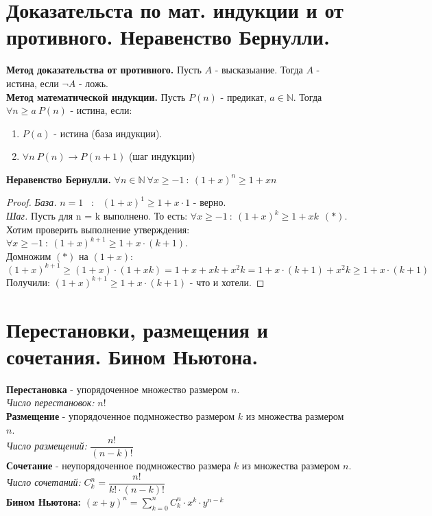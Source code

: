 \documentclass[12pt]{article}
\begin{document}
\section{Доказательста по мат. индукции и от противного. Неравенство Бернулли. }
    \textbf{Метод доказательства от противного.} Пусть $A$ - высказыание. Тогда $A$ - истина, если $\neg A$ - ложь. \\
    \textbf{Метод математической индукции.} Пусть $P(n)$ - предикат, $a \in \mathbb{N}$. Тогда $\forall n \geq a\ P(n)$ - истина, если: 
    \begin{enumerate}[itemsep=0mm, topsep=0mm, partopsep=0mm]
        \item $P(a)$ - истина (база индукции).
        \item $\forall n \ P(n) \to P(n+1)$ (шаг индукции)
    \end{enumerate}
    \textbf{Неравенство Бернулли.} $\forall n \in \mathbb{N} \ \forall x \geq -1 \ : \  (1 + x)^n \geq 1 + xn$ 
    \begin{proof}
        \textit{База.} $n = 1$ \ : \ $(1 + x)^1 \geq 1 + x \cdot 1$ - верно. \\
        \textit{Шаг.} Пусть для n = k выполнено. То есть:  $\forall x \geq -1 \ : \  (1+x)^k \geq 1 + xk \ \ (*)$.\\
        Хотим проверить выполнение утверждения:  $\forall x \geq -1 \ : \  (1+x)^{k+1} \geq 1 + x \cdot (k + 1)$. \\
        Домножим $(*)$ на $(1+x)$: \\
        $(1+x)^{k+1} \geq (1+x) \cdot (1+xk) = 1 + x + xk + x^2k = 1 + x \cdot (k + 1) + x^2k \geq 1 + x \cdot (k + 1) $ \\
        Получили: $(1+x)^{k+1} \geq 1 + x \cdot (k + 1)$ - что и хотели.
        
    \end{proof}

\section{Перестановки, размещения и сочетания. Бином Ньютона.}
    \textbf{Перестановка} - упорядоченное множество размером $n$. \\ \textit{Число перестановок:} $n!$ \\
    \textbf{Размещение} - упорядоченное подмножество размером $k$ из множества размером $n$. \\
    \textit{Число размещений:} $\dfrac{n!}{(n-k)!}$ \\
    \textbf{Сочетание} - неупорядоченное подмножество размера $k$ из множества размером $n$. \\
    \textit{Число сочетаний:} $C^n_k = \dfrac{n!}{k! \cdot (n-k)!}$ \\
    \textbf{Бином Ньютона: } $(x + y)^n = \sum_{k=0}^n C^n_k \cdot x^k \cdot y^{n-k}$
\end{document}
